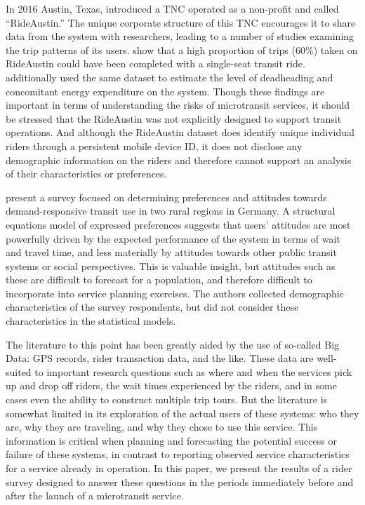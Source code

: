 \documentclass[smartcities,article,submit,moreauthors,pdftex]{Definitions/mdpi}
\begin{document}
In 2016 Austin, Texas, introduced a TNC operated as a non-profit and called “RideAustin.” The unique corporate structure of this TNC encourages it to share data from the system with researchers, leading to a number of studies examining the trip patterns of its users. \citet{Komanduri2018} show that a high proportion of trips (60\%) taken on RideAustin could have been completed with a single-seat transit ride. \citet{Wenzel2019} additionally used the same dataset to estimate the level of deadheading and concomitant energy expenditure on the system. Though these findings are important in terms of understanding the risks of microtransit services, it should be stressed that the RideAustin was not explicitly designed to support transit operations. And although the RideAustin dataset does identify unique individual riders through a persistent mobile device ID, it does not disclose any demographic information on the riders and therefore cannot support an analysis of their characteristics or preferences.

\citet{KONIG2020954} present a survey focused on determining preferences and attitudes towards demand-responsive transit use in two rural regions in Germany. A structural equations model of expressed preferences suggests that users' attitudes are most powerfully driven by the expected performance of the system in terms of wait and travel time, and less materially by attitudes towards other public transit systems or social perspectives. This is valuable insight, but attitudes such as these are difficult to forecast for a population, and therefore difficult to incorporate into service planning exercises. The authors collected demographic characteristics of the survey respondents, but did not consider these characteristics in the statistical models.

The literature to this point has been greatly aided by the use of so-called Big Data: GPS records, rider transaction data, and the like. These data are well-suited to important research questions such as where and when the services pick up and drop off riders, the wait times experienced by the riders, and in some cases even the ability to construct multiple trip tours. But the literature is somewhat limited in its exploration of the actual users of these systems: who they are, why they are traveling, and why they chose to use this service. This information is critical when planning and forecasting the potential success or failure of these systems, in contrast to reporting observed service characteristics for a service already in operation. In this paper, we present the results of a rider survey designed to answer these questions in the periods immediately before and after the launch of a microtransit service.
\end{document}

